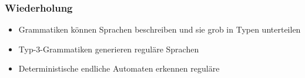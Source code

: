 \documentclass[aspectratio=1610,onlymath]{beamer}
\begin{document}
\maketitle


\begin{frame}\frametitle{Wiederholung}

\begin{itemize}
\item Grammatiken können Sprachen beschreiben und sie grob in Typen unterteilen
\item Typ-3-Grammatiken \alert{generieren} reguläre Sprachen
\item Deterministische endliche Automaten \alert{erkennen} reguläre 
\end{itemize}

\end{frame}


% 
% 
% 
\end{document}
